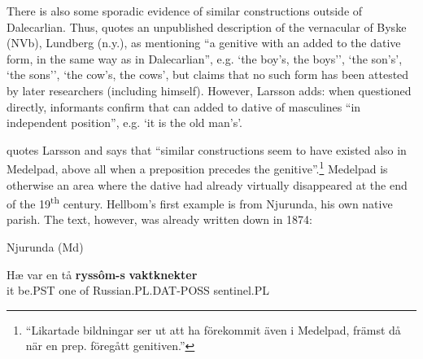 There is also some sporadic evidence of similar constructions outside of Dalecarlian. Thus, \citet[124]{Larsson1929} quotes an unpublished description of the vernacular of Byske (NVb), Lundberg (n.y.), as mentioning “a genitive with an  added to the dative form, in the same way as in Dalecarlian”, e.g.  ‘the boy’s, the boys’’,  ‘the son’s’,  ‘the sons’’,  ‘the cow’s, the cows’, but claims that no such form has been attested by later researchers (including himself). However, Larsson adds: when questioned directly, informants confirm that  can added to dative of masculines “in independent position”, e.g.  ‘it is the old man’s’. 


\citet[126]{Hellbom1961} quotes Larsson and says that “similar constructions seem to have existed also in Medelpad, above all when a preposition precedes the genitive”.\footnote{ “Likartade bildningar ser ut att ha förekommit även i Medelpad, främst då när en prep. föregått genitiven.”} Medelpad is otherwise an area where the dative had already virtually disappeared at the end of the 19\textsuperscript{th} century. Hellbom’s first example is from Njurunda, his own native parish. The text, however, was already written down in 1874:


\item 

\label{bkm:Ref126396484}Njurunda (Md)



 \ea\label{}
\gll Hæ  var  en  tå  \textbf{ryssôm-s}\textbf{  vaktknekter}\\


it  be.PST  one  of  Russian.PL.DAT-POSS  sentinel.PL\\

